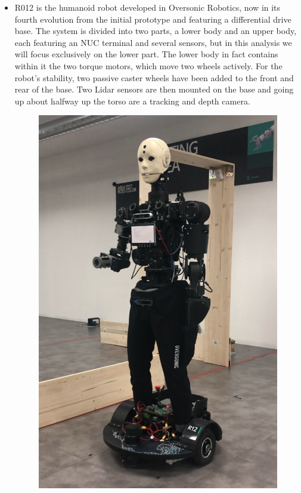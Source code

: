\begin{itemize}
\begin{figure}[H]
        \label{fig:r007}
    \end{figure}
    \newpage
    \item R012 is the humanoid robot developed in Oversonic Robotics, now in its fourth evolution from the initial prototype and featuring a differential drive base. The system is divided into two parts, a lower body and an upper body, each featuring an NUC terminal and several sensors, but in this analysis we will focus exclusively on the lower part. 
    The lower body in fact contains within it the two torque motors, which move two wheels actively. For the robot's stability, two passive caster wheels have been added to the front and rear of the base. Two Lidar sensors are then mounted on the base and going up about halfway up the torso are a tracking and depth camera. 
    \begin{figure}[H]
        \centering
        \includegraphics[scale=0.10]{Images/Chapter 3/r012.PNG}

\end{figure}
\end{itemize}
